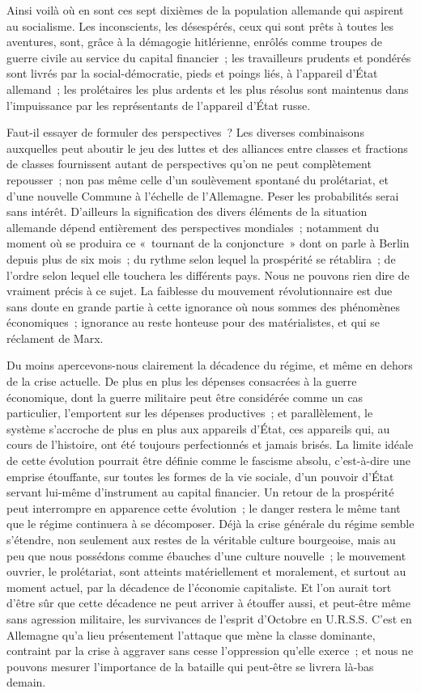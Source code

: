 \documentclass[french,twoside]{book} %
\begin{document}
\noindent Ainsi voilà où en sont ces sept dixièmes de la population allemande qui aspirent au socialisme. Les inconscients, les désespérés, ceux qui sont prêts à toutes les aventures, sont, grâce à la démagogie hitlérienne, enrôlés comme troupes de guerre civile au service du capital financier ; les travailleurs pru­dents et pondérés sont livrés par la social-démocratie, pieds et poings liés, à l'appareil d'État allemand ; les prolétaires les plus ardents et les plus résolus sont maintenus dans l'impuissance par les représentants de l'appareil d'État russe.\par
Faut-il essayer de formuler des perspectives ? Les diverses combinaisons auxquelles peut aboutir le jeu des luttes et des alliances entre classes et frac­tions de classes fournissent autant de perspectives qu'on ne peut complètement repousser ; non pas même celle d'un soulèvement spontané du prolétariat, et d'une nouvelle Commune à l'échelle de l'Allemagne. Peser les probabilités serai sans intérêt. D'ailleurs la signification des divers éléments de la situation allemande dépend entièrement des perspectives mondiales ; notamment du moment où se produira ce « tournant de la conjoncture » dont on parle à Berlin depuis plus de six mois ; du rythme selon lequel la prospérité se réta­blira ; de l'ordre selon lequel elle touchera les différents pays. Nous ne pouvons rien dire de vraiment précis à ce sujet. La faiblesse du mouvement révolutionnaire est due sans doute en grande partie à cette ignorance où nous sommes des phénomènes économiques ; ignorance au reste honteuse pour des matérialistes, et qui se réclament de Marx.\par
Du moins apercevons-nous clairement la décadence du régime, et même en dehors de la crise actuelle. De plus en plus les dépenses consacrées à la guerre économique, dont la guerre militaire peut être considérée comme un cas particulier, l'emportent sur les dépenses productives ; et parallèlement, le système s'accroche de plus en plus aux appareils d'État, ces appareils qui, au cours de l'histoire, ont été toujours perfectionnés et jamais brisés. La limite idéale de cette évolution pourrait être définie comme le fascisme absolu, c'est-à-dire une emprise étouffante, sur toutes les formes de la vie sociale, d'un pouvoir d'État servant lui-même d'instrument au capital financier. Un retour de la prospérité peut interrompre en apparence cette évolution ; le danger restera le même tant que le régime continuera à se décomposer. Déjà la crise générale du régime semble s'étendre, non seulement aux restes de la véritable culture bourgeoise, mais au peu que nous possédons comme ébauches d'une culture nouvelle ; le mouvement ouvrier, le prolétariat, sont atteints matériel­lement et moralement, et surtout au moment actuel, par la décadence de l'économie capitaliste. Et l'on aurait tort d'être sûr que cette décadence ne peut arriver à étouffer aussi, et peut-être même sans agression militaire, les survivances de l'esprit d'Octobre en U.R.S.S. C'est en Allemagne qu'a lieu présentement l'attaque que mène la classe dominante, contraint par la crise à aggraver sans cesse l'oppression qu'elle exerce ; et nous ne pouvons mesurer l'importance de la bataille qui peut-être se livrera là-bas demain.\par
\end{document}
